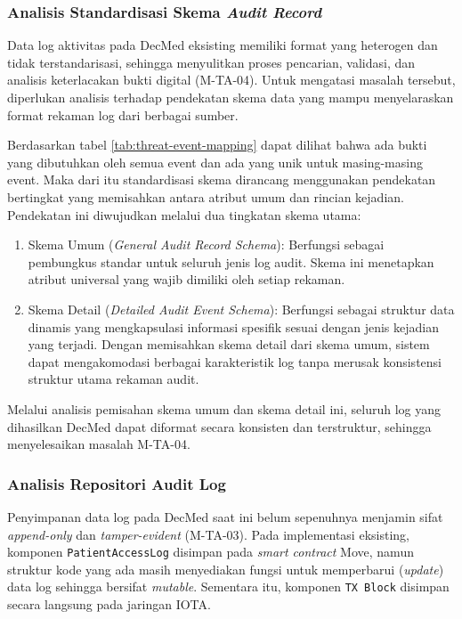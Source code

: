 \subsubsection{Analisis Standardisasi Skema \textit{Audit Record}}
\label{subsubsec:analisis-skema-audit-record}

Data log aktivitas pada DecMed eksisting memiliki format yang heterogen dan tidak terstandarisasi, sehingga menyulitkan proses pencarian, validasi, dan analisis keterlacakan bukti digital (M-TA-04). Untuk mengatasi masalah tersebut, diperlukan analisis terhadap pendekatan skema data yang mampu menyelaraskan format rekaman log dari berbagai sumber.

Berdasarkan tabel \ref{tab:threat-event-mapping} dapat dilihat bahwa ada bukti yang dibutuhkan oleh semua event dan ada yang unik untuk masing-masing event. Maka dari itu standardisasi skema dirancang menggunakan pendekatan bertingkat yang memisahkan antara atribut umum dan rincian kejadian. Pendekatan ini diwujudkan melalui dua tingkatan skema utama:

\begin{enumerate}
    \item Skema Umum (\textit{General Audit Record Schema}): Berfungsi sebagai pembungkus standar untuk seluruh jenis log audit. Skema ini menetapkan atribut universal yang wajib dimiliki oleh setiap rekaman.
    \item Skema Detail (\textit{Detailed Audit Event Schema}): Berfungsi sebagai struktur data dinamis yang mengkapsulasi informasi spesifik sesuai dengan jenis kejadian yang terjadi. Dengan memisahkan skema detail dari skema umum, sistem dapat mengakomodasi berbagai karakteristik log tanpa merusak konsistensi struktur utama rekaman audit.
\end{enumerate}

Melalui analisis pemisahan skema umum dan skema detail ini, seluruh log yang dihasilkan DecMed dapat diformat secara konsisten dan terstruktur, sehingga menyelesaikan masalah M-TA-04.

\subsubsection{Analisis Repositori Audit Log}
\label{subsubsec:analisis-repositori-audit-log}

Penyimpanan data log pada DecMed saat ini belum sepenuhnya menjamin sifat \textit{append-only} dan \textit{tamper-evident} (M-TA-03). Pada implementasi eksisting, komponen \texttt{PatientAccessLog} disimpan pada \textit{smart contract} Move, namun struktur kode yang ada masih menyediakan fungsi untuk memperbarui (\textit{update}) data log sehingga bersifat \textit{mutable}. Sementara itu, komponen \texttt{TX Block} disimpan secara langsung pada jaringan IOTA.

